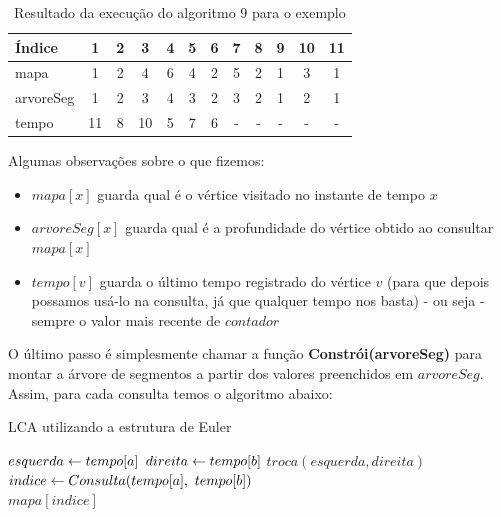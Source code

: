 \begin{table}[htb]
\centering
\begin{tabular}{|l|c|c|c|c|c|c|c|c|c|c|c|}
\hline
Índice      &  1 & 2 &  3 & 4 & 5 & 6 & 7 & 8 & 9 & 10 & 11 \\ \hline
mapa        &  1 & 2 &  4 & 6 & 4 & 2 & 5 & 2 & 1 &  3 &  1 \\ \hline
arvoreSeg   &  1 & 2 &  3 & 4 & 3 & 2 & 3 & 2 & 1 &  2 &  1 \\ \hline
tempo       & 11 & 8 & 10 & 5 & 7 & 6 & - & - & - &  - &  - \\ \hline

\end{tabular}
\caption{Resultado da execução do algoritmo 9 para o exemplo}
\end{table}

Algumas observações sobre o que fizemos:

\begin{itemize}
    \item $mapa[x]$ guarda qual é o vértice visitado no instante de tempo $x$
    \item $arvoreSeg[x]$ guarda qual é a profundidade do vértice obtido ao consultar $mapa[x]$
    \item $tempo[v]$ guarda o último tempo registrado do vértice $v$ (para que depois possamos usá-lo na consulta, já que qualquer tempo nos basta) - ou seja - sempre o valor mais recente de $contador$
\end{itemize}

\vspace{0.5cm}

O último passo é simplesmente chamar a função \textbf{Constrói(arvoreSeg)} para montar a árvore de segmentos a partir dos valores preenchidos em $arvoreSeg$. Assim, para cada consulta temos o algoritmo abaixo:

\begin{algorithm}[H]
\caption{LCA utilizando a estrutura de Euler}
\begin{algorithmic}[1]
    \State $esquerda \leftarrow tempo[a]$
    \State $direita \leftarrow tempo[b]$
        \State $troca(esquerda, direita)$
    \EndIf
    \State $indice \rec Consulta(tempo[a],\ tempo[b])$
    \\\hspace{5mm} \Return $mapa[indice]$
\EndFunction
\end{algorithmic}
\end{algorithm}

